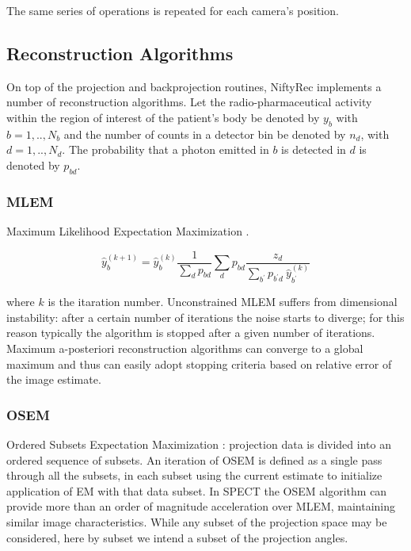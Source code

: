 \documentclass[12pt,a4paper]{report}
\begin{document}
\noindent The same series of operations is repeated for each camera's position.


\subsection{Reconstruction Algorithms}
On top of the projection and backprojection routines, NiftyRec implements a number of reconstruction algorithms. 
Let the radio-pharmaceutical activity within the region of interest of the patient's body be 
denoted by $y_b$ with $b=1,..,N_b$ and the number of counts in a detector bin be denoted by $n_d$, with $d=1,..,N_d$. The probability that a photon emitted 
in $b$ is detected in $d$ is denoted by $p_{bd}$.

\subsubsection{MLEM}
Maximum Likelihood Expectation Maximization \cite{shepp_1982}.

\begin{equation}
 \hat{y}_b^{(k+1)} = \hat{y}_b^{(k)} \frac{1}{\sum_{d}{p_{bd}}} \sum_{d}{p_{bd}\frac{z_d}{\sum_{b^{\prime}}p_{b^{\prime}d}\ \hat{y}^{(k)}_{b^{\prime}}}}
\end{equation}

\noindent where $k$ is the itaration number. Unconstrained MLEM suffers from dimensional instability: after a certain number of iterations the noise starts 
to diverge; for this reason typically the algorithm is stopped after a given number of iterations. Maximum a-posteriori reconstruction algorithms can converge 
to a global maximum and thus can easily adopt stopping criteria based on relative error of the image estimate. 

\subsubsection{OSEM}
Ordered Subsets Expectation Maximization \cite{hudson_1994}: projection data is divided into an ordered sequence of subsets. An iteration of OSEM is defined as a single pass
through all the subsets, in each subset using the current estimate to initialize application of EM with that data subset. 
In SPECT the OSEM algorithm can provide more than an order of magnitude acceleration over MLEM, maintaining similar image characteristics. 
While any subset of the projection space may be considered, here by subset we intend a subset of the projection angles. 
\end{document}

